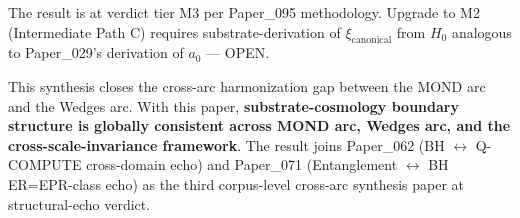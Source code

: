 \documentclass[11pt,a4paper]{article}
\begin{document}
The result is at verdict tier M3 per Paper\_095 methodology. Upgrade to M2 (Intermediate Path C) requires substrate-derivation of $\xi_\mathrm{canonical}$ from $H_0$ analogous to Paper\_029's derivation of $a_0$ --- OPEN.

This synthesis closes the cross-arc harmonization gap between the MOND arc and the Wedges arc. With this paper, \textbf{substrate-cosmology boundary structure is globally consistent across MOND arc, Wedges arc, and the cross-scale-invariance framework}. The result joins Paper\_062 (BH $\leftrightarrow$ Q-COMPUTE cross-domain echo) and Paper\_071 (Entanglement $\leftrightarrow$ BH ER=EPR-class echo) as the third corpus-level cross-arc synthesis paper at structural-echo verdict.
\end{document}
